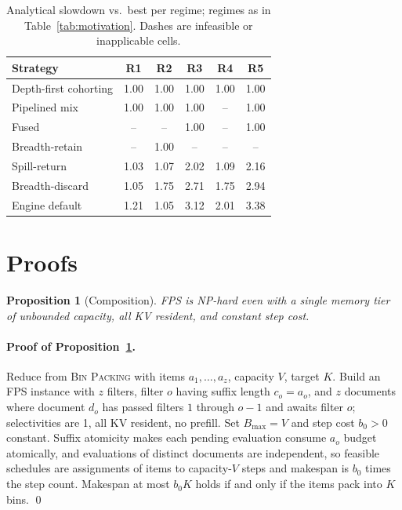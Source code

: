 \documentclass[10pt,twocolumn]{article}
\newtheorem{proposition}{Proposition}
\newcommand{\Bmax}{B_{\max}}
\begin{document}
\begin{table}[h]
\centering
\small
\begin{tabular}{l@{\hspace{6pt}}ccccc}
\toprule
Strategy & R1 & R2 & R3 & R4 & R5 \\
\midrule
Depth-first cohorting & 1.00 & 1.00 & 1.00 & 1.00 & 1.00 \\
Pipelined mix     & 1.00 & 1.00 & 1.00 &  --  & 1.00 \\
Fused             &  --  &  --  & 1.00 &  --  & 1.00 \\
Breadth-retain    &  --  & 1.00 &  --  &  --  &  --  \\
Spill-return      & 1.03 & 1.07 & 2.02 & 1.09 & 2.16 \\
Breadth-discard   & 1.05 & 1.75 & 2.71 & 1.75 & 2.94 \\
Engine default    & 1.21 & 1.05 & 3.12 & 2.01 & 3.38 \\
\bottomrule
\end{tabular}
\caption{Analytical slowdown vs.\ best per regime; regimes as in Table~\ref{tab:motivation}. Dashes are infeasible or inapplicable cells.}
\label{tab:allschedules}
\end{table}

\section{Proofs}
\label{app:proofs}

\begin{proposition}[Composition]
\label{thm:binpack}
FPS is NP-hard even with a single memory tier of unbounded capacity, all KV resident, and constant step cost.
\end{proposition}

\paragraph{Proof of Proposition~\ref{thm:binpack}.}
Reduce from \textsc{Bin Packing} with items $a_1,\dots,a_z$, capacity $V$, target $K$. Build an FPS instance with $z$ filters, filter $o$ having suffix length $c_o = a_o$, and $z$ documents where document $d_o$ has passed filters $1$ through $o{-}1$ and awaits filter $o$; selectivities are 1, all KV resident, no prefill. Set $\Bmax = V$ and step cost $b_0 > 0$ constant. Suffix atomicity makes each pending evaluation consume $a_o$ budget atomically, and evaluations of distinct documents are independent, so feasible schedules are assignments of items to capacity-$V$ steps and makespan is $b_0$ times the step count. Makespan at most $b_0 K$ holds if and only if the items pack into $K$ bins. \qed
\end{document}
